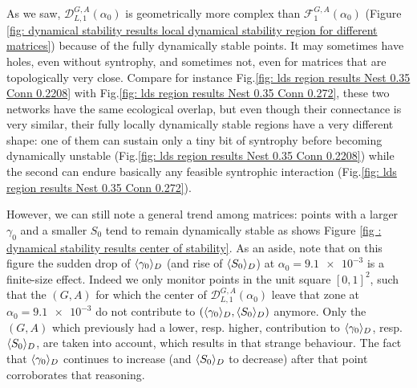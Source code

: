 \documentclass[12pt, titlepage]{report}
\begin{document}
As we saw, $\mathcal{D}_{L,1}^{G,A}\left(\alpha_0\right)$ is geometrically more complex than $\mathcal{F}_{1}^{G,A}\left(\alpha_0\right)$ (Figure \ref{fig: dynamical stability results local dynamical stability region for different matrices}) because of the  fully dynamically stable points.
 It may sometimes have holes, even without syntrophy, and sometimes not, even for matrices that are topologically very close. Compare for instance Fig.\ref{fig: lds region results Nest 0.35 Conn 0.2208} with Fig.\ref{fig: lds region results Nest 0.35 Conn 0.272}, these two networks have the same ecological overlap, but even though their connectance is very similar, their fully locally dynamically stable regions have a very different shape: one of them can sustain only a tiny bit of syntrophy before becoming dynamically unstable (Fig.\ref{fig: lds region results Nest 0.35 Conn 0.2208}) while the second can endure basically any feasible syntrophic interaction (Fig.\ref{fig: lds region results Nest 0.35 Conn 0.272}).

 However, we can still note a general trend among matrices: points with a larger $\gamma_0$ and a smaller $S_0$ tend to remain dynamically stable as shows Figure \ref{fig : dynamical stability results center of stability}. As an aside, note that on this figure the sudden drop of $\langle \gamma_0 \rangle_D$ (and rise of $\langle S_0 \rangle_D$) at $\alpha_0=\num{9.1e-3}$ is a finite-size effect. Indeed we only monitor points in the unit square $[0,1]^2$, such that the $(G,A)$ for which the center of $\mathcal{D}_{L,1}^{G,A}(\alpha_0)$ leave that zone at $\alpha_0=\num{9.1e-3}$ do not contribute to $(\langle \gamma_0 \rangle_D, \langle S_0 \rangle_D)$ anymore. Only the $(G,A)$ which previously had a lower, resp. higher, contribution to $\langle \gamma_0 \rangle_D$, resp. $\langle S_0 \rangle_D$, are taken into account, which results in that strange behaviour. The fact that $\langle \gamma_0 \rangle_D$ continues to increase (and $\langle S_0 \rangle_D$ to decrease) after that point corroborates that reasoning.
\end{document}
